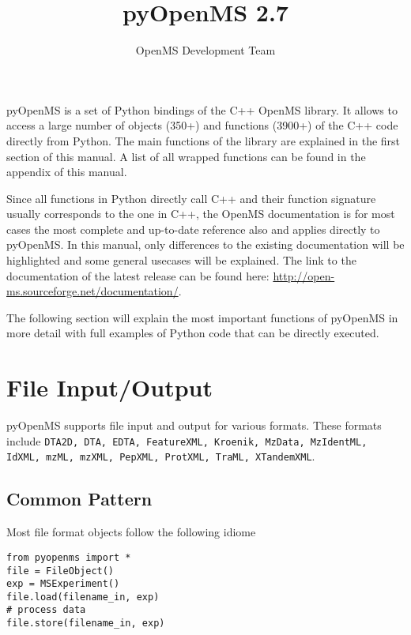 \documentclass[10pt]{article}
\title{pyOpenMS 2.7}
\author{OpenMS Development Team}
\date{}
\begin{document}
  \maketitle

  pyOpenMS is a set of Python bindings of the C++ OpenMS library. It allows to
  access a large number of objects (350+) and functions (3900+) of the C++
  code directly from Python.
  The main functions of the library are explained in the first section of this
  manual. A list of all wrapped functions can be found in the appendix of this
  manual.

  Since all functions in Python directly call C++ and their function signature
  usually corresponds to the one in C++, the OpenMS documentation is for most
  cases the most complete and up-to-date reference also and applies directly
  to pyOpenMS. In this manual, only differences to the existing documentation
  will be highlighted and some general usecases will be explained. The link to
  the documentation of the latest release can be found here:
  \url{http://open-ms.sourceforge.net/documentation/}.

  \tableofcontents

  \pagebreak

  The following section will explain the most important functions of pyOpenMS
  in more detail with full examples of Python code that can be directly
  executed.

\section{File Input/Output}

  pyOpenMS supports file input and output for various formats. These formats
  include \texttt{DTA2D, DTA, EDTA, FeatureXML, Kroenik, MzData, MzIdentML, IdXML, mzML,
  mzXML, PepXML, ProtXML, TraML, XTandemXML}.

\subsection{Common Pattern}

Most file format objects follow the following idiome

\begin{verbatim}
from pyopenms import *
file = FileObject()
exp = MSExperiment()
file.load(filename_in, exp)
# process data
file.store(filename_in, exp)
\end{verbatim}
\end{document}
